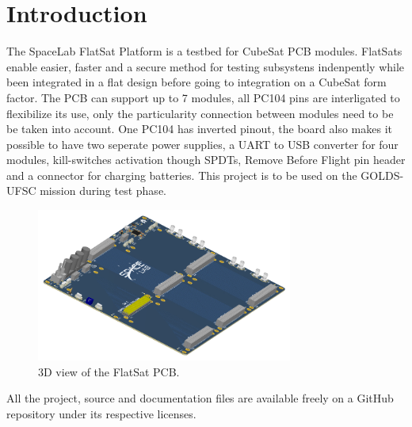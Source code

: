 %
%
%
%
%

%
%
%
%
%
%

\chapter{Introduction} \label{ch:introduction}

The SpaceLab FlatSat Platform is a testbed for CubeSat PCB modules. FlatSats enable easier, faster and a secure method for testing subsystens indenpently while been integrated in a flat design before going to integration on a CubeSat form factor. The PCB can support up to 7 modules, all PC104 pins are interligated to flexibilize its use, only the particularity connection between modules need to be be taken into account. One PC104 has inverted pinout, the board also makes it possible to have two seperate power supplies, a UART to USB converter for four modules, kill-switches activation though SPDTs, Remove Before Flight pin header and a connector for charging batteries. This project is to be used on the GOLDS-UFSC mission \cite{golds-ufsc} during test phase.

\begin{figure}[!ht]
    \begin{center}
        \includegraphics[width=0.75\textwidth]{figures/flatsat_perspective_image.png}
        \caption{3D view of the FlatSat PCB.}
        \label{fig:pcb-3d}
    \end{center}
\end{figure}

All the project, source and documentation files are available freely on a GitHub repository \cite{interface-board-repo} under its respective licenses.